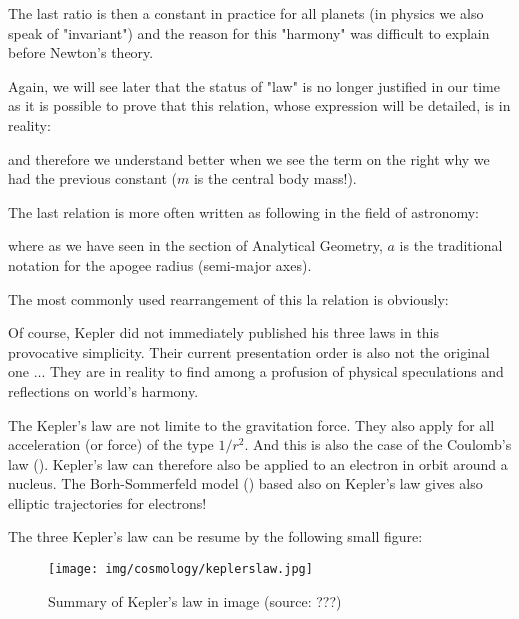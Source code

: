 	The last ratio is then a constant in practice for all planets (in physics we also speak of "invariant") and the reason for this "harmony" was difficult to explain before Newton's theory.
	
	Again, we will see later that the status of "law" is no longer justified in our time as it is possible to prove that this relation, whose expression will be detailed, is in reality:
	
	and therefore we understand better when we see the term on the right why we had the previous constant ($m$ is the central body mass!).
	
	The last relation is more often written as following in the field of astronomy:
	
	where as we have seen in the section of Analytical Geometry, $a$ is the traditional notation for the apogee radius (semi-major axes).
	
	The most commonly used rearrangement of this la relation is obviously:
	
		
	Of course, Kepler did not immediately published his three laws in this provocative simplicity. Their current presentation order is also not the original one ... They are  in reality to find among  a profusion of physical speculations and reflections on world's harmony.
	
	\begin{tcolorbox}[title=Remark,colframe=black,arc=10pt]
	The Kepler's law are not limite to the gravitation force. They also apply for all acceleration (or force) of the type $1/r^2$. And this is also the case of the Coulomb's law (). Kepler's law can therefore also be applied to an electron in orbit around a nucleus. The Borh-Sommerfeld model () based also on Kepler's law gives also elliptic trajectories for electrons!
	\end{tcolorbox}	
	
	The three Kepler's law can be resume by the following small figure:
	\begin{figure}[H]
		\begin{center}
		\texttt{[image: img/cosmology/keplerslaw.jpg]}
		\end{center}	
		\caption{Summary of Kepler's law in image (source: ???)}
	\end{figure}
	
